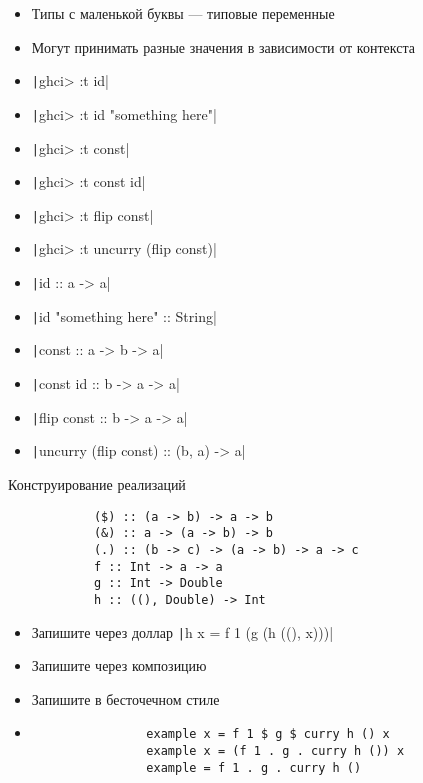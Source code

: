 
    \begin{frame}[fragile]{\secname}
        \begin{itemize}
            \item Типы с маленькой буквы --- типовые переменные
            \item Могут принимать разные значения в зависимости от контекста
            \item[\todo] \texttt|ghci> :t id|
            \item[\todo] \texttt|ghci> :t id "something here"|
            \item[\todo] \texttt|ghci> :t const|
            \item[\todo] \texttt|ghci> :t const id|
            \item[\todo] \texttt|ghci> :t flip const|
            \item[\todo] \texttt|ghci> :t uncurry (flip const)|
            \item[\answer] \pause \texttt|id :: a -> a|
            \item[\answer] \pause \texttt|id "something here" :: String|
            \item[\answer] \pause \texttt|const :: a -> b -> a|
            \item[\answer] \pause \texttt|const id :: b -> a -> a|
            \item[\answer] \pause \texttt|flip const :: b -> a -> a|
            \item[\answer] \pause \texttt|uncurry (flip const) :: (b, a) -> a|
        \end{itemize}
    \end{frame}
    
    \begin{frame}[fragile]{Конструирование реализаций}
        \begin{verbatim}
            ($) :: (a -> b) -> a -> b
            (&) :: a -> (a -> b) -> b
            (.) :: (b -> c) -> (a -> b) -> a -> c
            f :: Int -> a -> a
            g :: Int -> Double
            h :: ((), Double) -> Int
        \end{verbatim}
        \begin{itemize}
            \item[\todo] Запишите через доллар \texttt|h x = f 1 (g (h ((), x)))|
            \item[\todo] Запишите через композицию
            \item[\todo] Запишите в бесточечном стиле
            \item[\answer] \pause
            \begin{verbatim}
                example x = f 1 $ g $ curry h () x
                example x = (f 1 . g . curry h ()) x
                example = f 1 . g . curry h ()
            \end{verbatim}
        \end{itemize}
    \end{frame}


